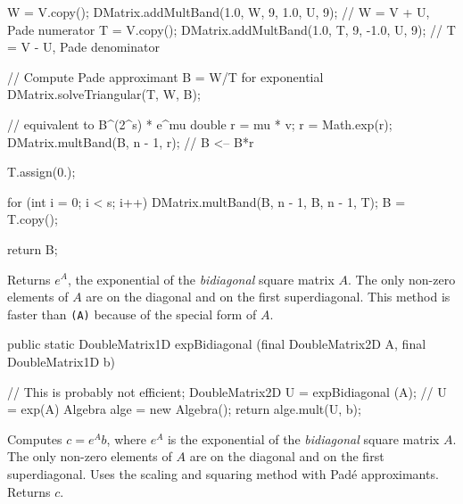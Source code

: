 \begin{code}
\begin{hide}
{      W = V.copy();
      DMatrix.addMultBand(1.0, W, 9, 1.0, U, 9); // W = V + U, Pade numerator
      T = V.copy();
      DMatrix.addMultBand(1.0, T, 9, -1.0, U, 9); // T = V - U, Pade denominator

      // Compute Pade approximant B = W/T for exponential
      DMatrix.solveTriangular(T, W, B);

      // equivalent to B^(2^s) * e^mu
      double r = mu * v;
      r = Math.exp(r);
      DMatrix.multBand(B, n - 1, r); // B <-- B*r

      T.assign(0.);

      for (int i = 0; i < s; i++) {
         DMatrix.multBand(B, n - 1, B, n - 1, T);
         B = T.copy();
      }

      return B;
	}\end{hide}
\end{code}
\begin{tabb} Returns $e^A$, the exponential of the \emph{bidiagonal}
 square matrix $A$. The only non-zero elements of $A$ are on the diagonal and
 on the first superdiagonal. This method is faster than
\texttt{(A)} because of the special form of $A$.
\end{tabb}
\begin{htmlonly}
\end{htmlonly}
\begin{code}

   public static DoubleMatrix1D expBidiagonal (final DoubleMatrix2D A,
                                               final DoubleMatrix1D b) \begin{hide} {
      // This is probably not efficient;
      DoubleMatrix2D U = expBidiagonal (A);   // U = exp(A)
      Algebra alge = new Algebra();
      return alge.mult(U, b);
   }\end{hide}
\end{code}
\begin{tabb} Computes $c = e^A b$, where $e^A$ is the exponential of the \emph{bidiagonal}
 square matrix $A$. The only non-zero elements of $A$ are on the diagonal and
 on the first superdiagonal.
Uses the scaling and squaring method \cite{mHIG09a} with
Pad\'e approximants. Returns $c$.
\end{tabb}
\begin{htmlonly}
\end{htmlonly}
